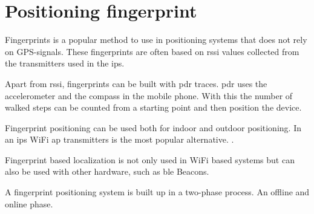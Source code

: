 \section{Positioning fingerprint}\label{sec:theoryFingerprint}
Fingerprints is a popular method to use in positioning systems that does not rely on GPS-signals.
These fingerprints are often based on \acrshort{rssi} values collected from the transmitters used in the \acrfull{ips}.
\cite{LocationFingerprintingInfrastructure2004, AutomaticConstructionRadio2018}

\bigskip


\bigskip

Apart from \acrshort{rssi}, fingerprints can be built with \acrfull{pdr} traces.
\acrshort{pdr} uses the accelerometer and the compass in the mobile phone.
With this the number of walked steps can be counted from a starting point and then position the device.
\cite{AutomaticConstructionRadio2018, NoNeedWardrive2012}

\bigskip

Fingerprint positioning can be used both for indoor and outdoor positioning.
In an \acrshort{ips} WiFi \acrshort{ap} transmitters is the most popular alternative.
\cite{LocationFingerprintingInfrastructure2004,
IndoorFingerprintPositioning2017}.

\bigskip

Fingerprint based localization is not only used in WiFi based systems but can
also be used with other hardware, such as \acrlong{ble} Beacons.
\cite{PracticalFingerprintingLocalization2017} 

\bigskip

A fingerprint positioning system is built up in a two-phase process.
An offline and online phase.\cite{IndoorFingerprintPositioning2017} 


